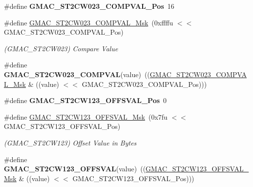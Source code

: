 \begin{DoxyCompactItemize}
\item 
\mbox{\label{group__SAMV71__GMAC_ga647470359416c0f2904fb348cc57428b}} 
\#define {\bfseries G\+M\+A\+C\+\_\+\+S\+T2\+C\+W023\+\_\+\+C\+O\+M\+P\+V\+A\+L\+\_\+\+Pos}~16
\item 
\mbox{\label{group__SAMV71__GMAC_ga773b07da96c840b43ae93932aa444c7f}} 
\#define \mbox{\hyperlink{group__SAMV71__GMAC_ga773b07da96c840b43ae93932aa444c7f}{G\+M\+A\+C\+\_\+\+S\+T2\+C\+W023\+\_\+\+C\+O\+M\+P\+V\+A\+L\+\_\+\+Msk}}~(0xffffu $<$$<$ G\+M\+A\+C\+\_\+\+S\+T2\+C\+W023\+\_\+\+C\+O\+M\+P\+V\+A\+L\+\_\+\+Pos)
\begin{DoxyCompactList}\small\item\em (G\+M\+A\+C\+\_\+\+S\+T2\+C\+W023) Compare Value \end{DoxyCompactList}\item 
\mbox{\label{group__SAMV71__GMAC_gaa565a11bc2b6aa89b08a0eb32f76aa8e}} 
\#define {\bfseries G\+M\+A\+C\+\_\+\+S\+T2\+C\+W023\+\_\+\+C\+O\+M\+P\+V\+AL}(value)~((\mbox{\hyperlink{group__SAMV71__GMAC_ga773b07da96c840b43ae93932aa444c7f}{G\+M\+A\+C\+\_\+\+S\+T2\+C\+W023\+\_\+\+C\+O\+M\+P\+V\+A\+L\+\_\+\+Msk}} \& ((value) $<$$<$ G\+M\+A\+C\+\_\+\+S\+T2\+C\+W023\+\_\+\+C\+O\+M\+P\+V\+A\+L\+\_\+\+Pos)))
\item 
\mbox{\label{group__SAMV71__GMAC_gab6656e92daf596babd97809e8d118ba3}} 
\#define {\bfseries G\+M\+A\+C\+\_\+\+S\+T2\+C\+W123\+\_\+\+O\+F\+F\+S\+V\+A\+L\+\_\+\+Pos}~0
\item 
\mbox{\label{group__SAMV71__GMAC_ga47db9c881422e72dfc060622dbdac7e2}} 
\#define \mbox{\hyperlink{group__SAMV71__GMAC_ga47db9c881422e72dfc060622dbdac7e2}{G\+M\+A\+C\+\_\+\+S\+T2\+C\+W123\+\_\+\+O\+F\+F\+S\+V\+A\+L\+\_\+\+Msk}}~(0x7fu $<$$<$ G\+M\+A\+C\+\_\+\+S\+T2\+C\+W123\+\_\+\+O\+F\+F\+S\+V\+A\+L\+\_\+\+Pos)
\begin{DoxyCompactList}\small\item\em (G\+M\+A\+C\+\_\+\+S\+T2\+C\+W123) Offset Value in Bytes \end{DoxyCompactList}\item 
\mbox{\label{group__SAMV71__GMAC_ga6072fb94007a767f9c66cc874df4a4e1}} 
\#define {\bfseries G\+M\+A\+C\+\_\+\+S\+T2\+C\+W123\+\_\+\+O\+F\+F\+S\+V\+AL}(value)~((\mbox{\hyperlink{group__SAMV71__GMAC_ga47db9c881422e72dfc060622dbdac7e2}{G\+M\+A\+C\+\_\+\+S\+T2\+C\+W123\+\_\+\+O\+F\+F\+S\+V\+A\+L\+\_\+\+Msk}} \& ((value) $<$$<$ G\+M\+A\+C\+\_\+\+S\+T2\+C\+W123\+\_\+\+O\+F\+F\+S\+V\+A\+L\+\_\+\+Pos)))

\end{DoxyCompactItemize}
